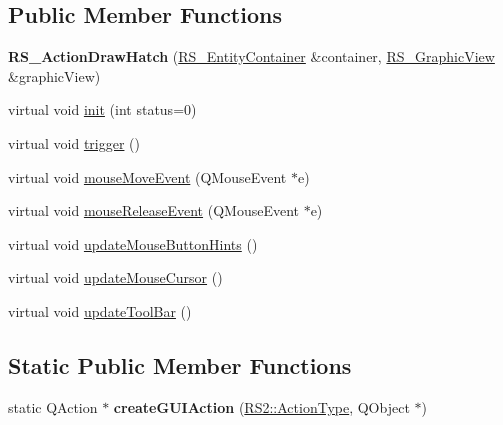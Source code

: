\subsection*{Public Member Functions}
\begin{DoxyCompactItemize}
\item 
\hypertarget{classRS__ActionDrawHatch_af3d52d471088ff8a5457ba276d0614c7}{{\bfseries R\-S\-\_\-\-Action\-Draw\-Hatch} (\hyperlink{classRS__EntityContainer}{R\-S\-\_\-\-Entity\-Container} \&container, \hyperlink{classRS__GraphicView}{R\-S\-\_\-\-Graphic\-View} \&graphic\-View)}\label{classRS__ActionDrawHatch_af3d52d471088ff8a5457ba276d0614c7}

\item 
virtual void \hyperlink{classRS__ActionDrawHatch_ad0a96bb9f9acda961b377b9fd60f9851}{init} (int status=0)
\item 
virtual void \hyperlink{classRS__ActionDrawHatch_a60429f89f0ddf091288f0b79b1bd320c}{trigger} ()
\item 
virtual void \hyperlink{classRS__ActionDrawHatch_ad5804a65e39a555873e7433a036109d1}{mouse\-Move\-Event} (Q\-Mouse\-Event $\ast$e)
\item 
virtual void \hyperlink{classRS__ActionDrawHatch_a7ee612b411d7eeb7fc00361b030e8539}{mouse\-Release\-Event} (Q\-Mouse\-Event $\ast$e)
\item 
virtual void \hyperlink{classRS__ActionDrawHatch_a3632f07de4070e80d3f5a7a10269559d}{update\-Mouse\-Button\-Hints} ()
\item 
virtual void \hyperlink{classRS__ActionDrawHatch_ae6756579e3f5060638634a9748e9d116}{update\-Mouse\-Cursor} ()
\item 
virtual void \hyperlink{classRS__ActionDrawHatch_a4618ddc732966a862d182af4953fa712}{update\-Tool\-Bar} ()
\end{DoxyCompactItemize}
\subsection*{Static Public Member Functions}
\begin{DoxyCompactItemize}
\item 
\hypertarget{classRS__ActionDrawHatch_a109cf6554e3109006139906f12a3ec7d}{static Q\-Action $\ast$ {\bfseries create\-G\-U\-I\-Action} (\hyperlink{classRS2_afe3523e0bc41fd637b892321cfc4b9d7}{R\-S2\-::\-Action\-Type}, Q\-Object $\ast$)}\label{classRS__ActionDrawHatch_a109cf6554e3109006139906f12a3ec7d}

\end{DoxyCompactItemize}

